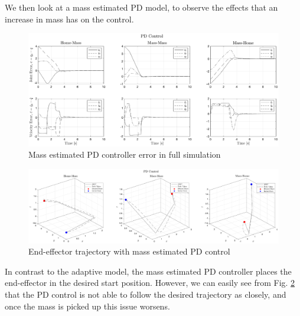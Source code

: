 We then look at a mass estimated PD model, to observe the effects that an increase in mass has on the control.
\begin{figure}[H]
	\centering
	\includegraphics[width=\textwidth]{figures/mass10NNerrPD.eps}
	\caption{Mass estimated PD controller error in full simulation}
	\label{fig:nnerrpd}
\end{figure}
\begin{figure}[H]
	\centering
	\includegraphics[width=\textwidth]{figures/mass10NNeetrajPD.eps}
	\caption{End-effector trajectory with mass estimated PD control}
	\label{fig:nntrajpd}
\end{figure}
\noindent In contrast to the adaptive model, the mass estimated PD controller places the end-effector in the desired start position.
However, we can easily see from Fig. \ref{fig:nntrajpd} that the PD control is not able to follow the desired trajectory as closely, and once the mass is picked up this issue worsens.
